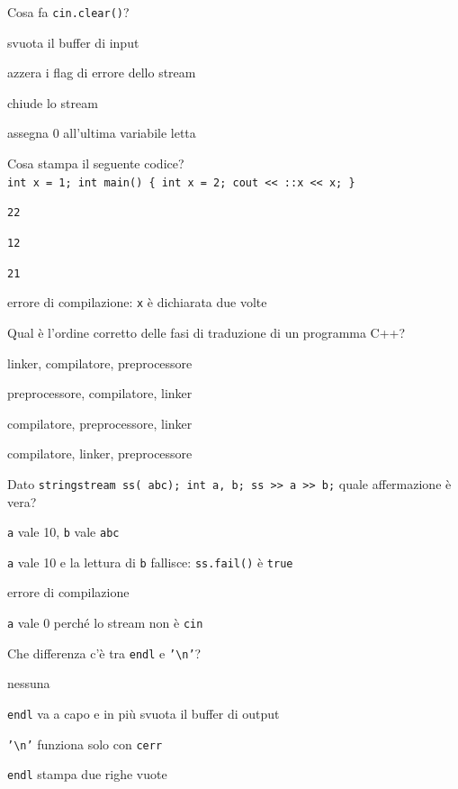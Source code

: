 \begin{quiz}{Cosa fa \texttt{cin.clear()}?}
  \item svuota il buffer di input
  \item azzera i flag di errore dello stream
  \item chiude lo stream
  \item assegna 0 all'ultima variabile letta
\end{quiz}

\begin{quiz}{Cosa stampa il seguente codice? \\
\texttt{int x = 1;  int main() \{ int x = 2; cout << ::x << x; \}}}
  \item \texttt{22}
  \item \texttt{12}
  \item \texttt{21}
  \item errore di compilazione: \texttt{x} è dichiarata due volte
\end{quiz}

\begin{quiz}{Qual è l'ordine corretto delle fasi di traduzione di un programma C++?}
  \item linker, compilatore, preprocessore
  \item preprocessore, compilatore, linker
  \item compilatore, preprocessore, linker
  \item compilatore, linker, preprocessore
\end{quiz}

\begin{quiz}{Dato \texttt{stringstream ss( abc\textquotedbl); int a, b; ss >> a >> b;} quale affermazione è vera?}
  \item \texttt{a} vale 10, \texttt{b} vale \texttt{abc}
  \item \texttt{a} vale 10 e la lettura di \texttt{b} fallisce: \texttt{ss.fail()} è \texttt{true}
  \item errore di compilazione
  \item \texttt{a} vale 0 perché lo stream non è \texttt{cin}
\end{quiz}

\begin{quiz}{Che differenza c'è tra \texttt{endl} e \texttt{'\textbackslash n'}?}
  \item nessuna
  \item \texttt{endl} va a capo e in più svuota il buffer di output
  \item \texttt{'\textbackslash n'} funziona solo con \texttt{cerr}
  \item \texttt{endl} stampa due righe vuote
\end{quiz}

